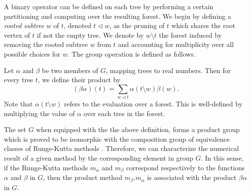 A binary operator can be defined on each tree by performing a certain partitioning and computing over the resulting forest.  We
begin by defining a \emph{rooted subtree} $w$ of $t$, denoted $t \lhd w$, as the pruning of $t$ which shares the root vertex of $t$ if not the empty tree.  We denote by $w \setminus t$ the forest induced by removing the rooted subtree $w$ from $t$ and accounting for multiplicity over all possible choices for $w$. %
The group operation is defined as follows.
\begin{definition}\cite{Butcher2008_book}\label{def:Group_operation}
	Let $\alpha$ and $\beta$ be two members of $G$, mapping trees to real numbers. Then for every tree $t$, we define their product by
	\begin{equation}\label{eq:Group_operation}
		(\beta\alpha)(t) = \sum_{w \lhd t}\alpha(t \setminus w)\beta(w).
	\end{equation}
	Note that $\alpha(t \setminus w)$ refers to the evaluation over a forest. This is well-defined by multiplying the value of $\alpha$ over each tree in the forest.
\end{definition}
The set $G$ when equipped with the the above definition, forms a product group which is proved to be isomorphic with the composition group of equivalence classes of Runge-Kutta methods \cite{Butcher1972, Butcher1987_book}. Therefore, we can characterize the numerical result of a given method by the corresponding element in group $G$. In this sense, if the Runge-Kutta methods $m_\alpha$ and $m_\beta$ correspond respectively to the functions $\alpha$ and $\beta$ in $G$, then the product method $m_\beta.m_\alpha$ is associated with the product $\beta\alpha$ in $G$.
